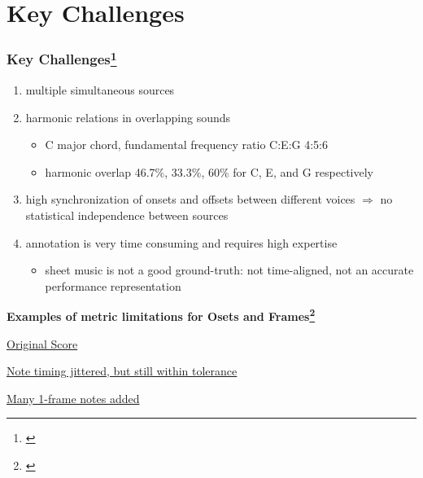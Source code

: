 \documentclass{beamer}
\newcommand{\emp}[1]{\textcolor{tum}{\textbf{#1}}}
\begin{document}
\section{Key Challenges}
\begin{frame}
	\frametitle{Key Challenges\footnote{\cite{Overview}}}
	\begin{enumerate}
		\item multiple simultaneous sources
		\item harmonic relations in overlapping sounds
		      \begin{itemize}
			      \item C major chord, fundamental frequency ratio C:E:G 4:5:6
			      \item harmonic overlap 46.7\%, 33.3\%, 60\% for C, E, and G respectively
		      \end{itemize}
		\item high synchronization of onsets and offsets between different voices $\Rightarrow$ no statistical independence between sources
		\item annotation is very time consuming and requires high expertise
		      \begin{itemize}
			      \item sheet music is not a good ground-truth: not time-aligned, not an accurate performance representation
		      \end{itemize}
	\end{enumerate}

	\emp{Examples of metric limitations for Osets and Frames\footnote{\cite{OF}}}

	\href{https://storage.googleapis.com/magentadata/papers/onsets-frames/fur_elise_framescore_good2.mp3}{Original Score}

	\href{https://storage.googleapis.com/magentadata/papers/onsets-frames/fur_elise_notejitter_score1.mp3}{Note timing jittered, but still within tolerance}

	\href{https://storage.googleapis.com/magentadata/papers/onsets-frames/fur_elise_framescore_bad3.mp3}{Many 1-frame notes added}

\end{frame}

\end{document}
